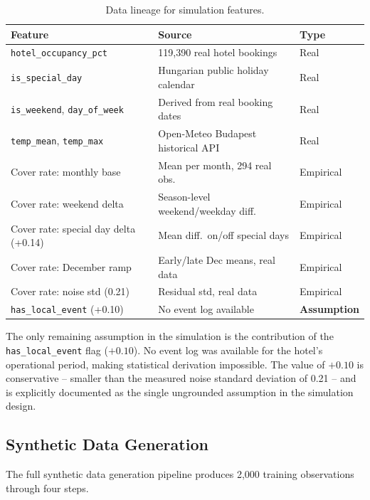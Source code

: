 \documentclass[12pt,a4paper,oneside]{article}
\begin{document}
\begin{table}[H]
\centering
\small
\begin{tabular}{@{}p{3.8cm}p{4.5cm}p{1.8cm}@{}}
\toprule
\textbf{Feature} & \textbf{Source} & \textbf{Type} \\
\midrule
\texttt{hotel\_occupancy\_pct}           & 119,390 real hotel bookings        & Real \\
\texttt{is\_special\_day}                 & Hungarian public holiday calendar  & Real \\
\texttt{is\_weekend}, \texttt{day\_of\_week} & Derived from real booking dates & Real \\
\texttt{temp\_mean}, \texttt{temp\_max}   & Open-Meteo Budapest historical API & Real \\
Cover rate: monthly base                 & Mean per month, 294 real obs.      & Empirical \\
Cover rate: weekend delta                & Season-level weekend/weekday diff. & Empirical \\
Cover rate: special day delta (+0.14)    & Mean diff.\ on/off special days    & Empirical \\
Cover rate: December ramp                & Early/late Dec means, real data    & Empirical \\
Cover rate: noise std (0.21)             & Residual std, real data            & Empirical \\
\texttt{has\_local\_event} (+0.10)       & No event log available             & \textbf{Assumption} \\
\bottomrule
\end{tabular}
\caption{Data lineage for simulation features.}
\label{tab:lineage}
\end{table}

The only remaining assumption in the simulation is the contribution of the \texttt{has\_local\_event} flag ($+0.10$). No event log was available for the hotel's operational period, making statistical derivation impossible. The value of $+0.10$ is conservative -- smaller than the measured noise standard deviation of 0.21 -- and is explicitly documented as the single ungrounded assumption in the simulation design.

\subsection{Synthetic Data Generation}
\label{sec:synth}

The full synthetic data generation pipeline produces 2,000 training observations through four steps.
\end{document}
